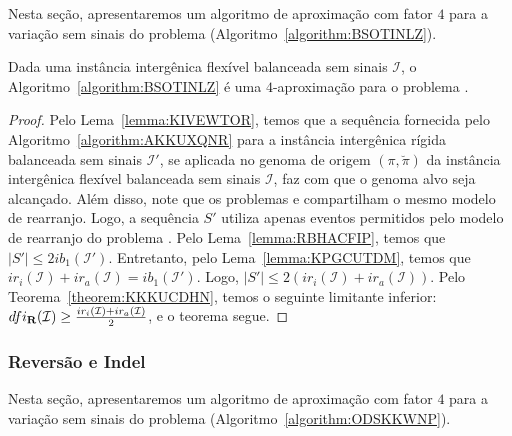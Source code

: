 Nesta seção, apresentaremos um algoritmo de aproximação com fator $4$ para a variação sem sinais do problema \SbFIR{} (Algoritmo~\ref{algorithm:BSOTINLZ}).



\begin{theorem}\label{theorem:WKATVVBS}
Dada uma instância intergênica flexível balanceada sem sinais $\mathcal{I}$, o Algoritmo~\ref{algorithm:BSOTINLZ} é uma $4$-aproximação para o problema \SbFIR{}.
\end{theorem}
\begin{proof}
Pelo Lema~\ref{lemma:KIVEWTOR}, temos que a sequência fornecida pelo Algoritmo~\ref{algorithm:AKKUXQNR} para a instância intergênica rígida balanceada sem sinais $\mathcal{I'}$, se aplicada no genoma de origem $(\pi,\breve\pi)$ da instância intergênica flexível balanceada sem sinais $\mathcal{I}$, faz com que o genoma alvo seja alcançado. Além disso, note que os problemas \SbIR{} e \SbFIR{} compartilham o mesmo modelo de rearranjo. Logo, a sequência $S'$ utiliza apenas eventos permitidos pelo modelo de rearranjo do problema \SbFIR{}. Pelo Lema~\ref{lemma:RBHACFIP}, temos que $|S'| \le 2ib_1(\mathcal{I'})$. Entretanto, pelo Lema~\ref{lemma:KPGCUTDM}, temos que $ir_i(\mathcal{I}) + ir_a(\mathcal{I}) = ib_1(\mathcal{I'})$. Logo, $|S'| \le 2(ir_i(\mathcal{I}) + ir_a(\mathcal{I}))$. Pelo Teorema~\ref{theorem:KKKUCDHN}, temos o seguinte limitante inferior: $dfi_{\textbf{R}}(\mathcal{I}) \ge \frac{ir_i(\mathcal{I}) + ir_a(\mathcal{I})}{2}$, e o teorema segue.
\end{proof}

\subsubsection{Reversão e Indel}

Nesta seção, apresentaremos um algoritmo de aproximação com fator $4$ para a variação sem sinais do problema \SbFIRI{} (Algoritmo~\ref{algorithm:ODSKKWNP}).



